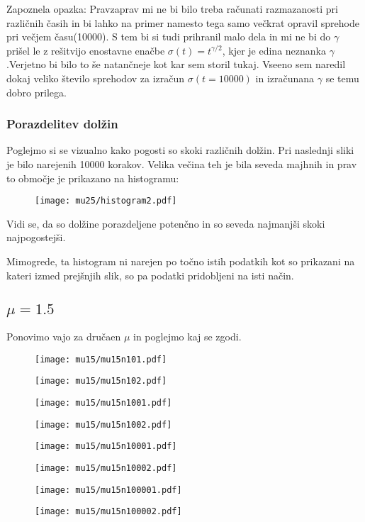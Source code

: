 \documentclass{article}
\begin{document}
Zapoznela opazka:
Pravzaprav mi ne bi bilo treba računati razmazanosti pri različnih časih in bi lahko na primer namesto tega samo večkrat opravil sprehode pri večjem času(10000). S tem bi si tudi prihranil malo dela in mi ne bi do $\gamma$ prišel le z rešitvijo enostavne enačbe $\sigma(t) = t^{\gamma/2}$, kjer je edina neznanka $\gamma$.Verjetno bi bilo to še natančneje kot kar sem storil tukaj. Vseeno sem naredil dokaj veliko število sprehodov za izračun $\sigma(t=10000)$ in izračunana $\gamma$ se temu dobro prilega.

\subsubsection{Porazdelitev dolžin}

Poglejmo si se vizualno kako pogosti so skoki različnih dolžin. Pri naslednji sliki je bilo narejenih 10000 korakov.
Velika večina teh je bila seveda majhnih in prav to območje je prikazano na histogramu:

\begin{figure}[H]
\texttt{[image: mu25/histogram2.pdf]}
\end{figure}
Vidi se, da so dolžine porazdeljene potenčno in so seveda najmanjši skoki najpogostejši.

Mimogrede, ta histogram ni narejen po točno istih podatkih kot so prikazani na kateri izmed prejšnjih slik, so pa podatki pridobljeni na isti način.

\subsection{$\mu=1.5$}
Ponovimo vajo za dručaen $\mu$ in poglejmo kaj se zgodi.

\begin{figure}[H]
\texttt{[image: mu15/mu15n101.pdf]}
\end{figure}
\begin{figure}[H]
\texttt{[image: mu15/mu15n102.pdf]}
\end{figure}
\begin{figure}[H]
\texttt{[image: mu15/mu15n1001.pdf]}
\end{figure}
\begin{figure}[H]
\texttt{[image: mu15/mu15n1002.pdf]}
\end{figure}
\begin{figure}[H]
\texttt{[image: mu15/mu15n10001.pdf]}
\end{figure}
\begin{figure}[H]
\texttt{[image: mu15/mu15n10002.pdf]}
\end{figure}
\begin{figure}[H]
\texttt{[image: mu15/mu15n100001.pdf]}
\end{figure}
\begin{figure}[H]
\texttt{[image: mu15/mu15n100002.pdf]}
\end{figure}
\end{document}
